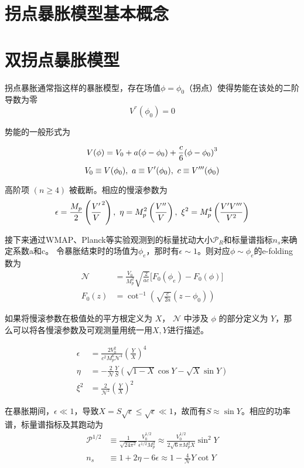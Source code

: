 \section{拐点暴胀模型基本概念}
\section{双拐点暴胀模型}
拐点暴胀通常指这样的暴胀模型，存在场值$\phi=\phi_0$（拐点）使得势能在该处的二阶导数为零
\begin{equation}
    V^{\dprime}(\phi_0) = 0
\end{equation}

势能的一般形式为

\begin{equation}
    \label{eq:inf_potential}
    V (\phi)=V_0+a (\phi-\phi_0)+\frac{c}{6}{\left(\phi-\phi_0\right)}^3\\
\end{equation}
\begin{equation}
    V_0\equiv V (\phi_0),\ a\equiv V' (\phi_0),\ c\equiv V^{\tprime} (\phi_0) 
\end{equation}

高阶项 $(n \geq 4)$ 被截断。相应的慢滚参数为
\begin{equation}
    \label{eq:psrp}
    \epsilon = \frac{M_p}{2}\left(\frac{V'}{V}^2\right),\ \eta=M^2_p
    \left(\frac{V^{\dprime}}{V}\right),\ \xi^2=M^4_p\left(\frac{V'V^{\tprime}}{V^2}\right)
\end{equation}

接下来通过WMAP、Planck等实验观测到的标量扰动大小$\mathcal{P}_R$和标量谱指标$n_s$来确定系数a和c。
令暴胀结束时的场值为$\phi_e$，那时有$\epsilon\sim
1$。则对应$\phi\sim\phi_e$的e-folding数为
\begin{align}
    \label{eq:e-folding}
    \mathcal{N} &= \frac{V_0}{M^2_p}\sqrt{\frac{2}{ac}}\lbrack
    F_0(\phi_e)-F_0(\phi)\rbrack \\
    F_0(z) &= \cot^{-1}\left(\sqrt{\frac{c}{2a}}(z-\phi_0)\right)
\end{align}

如果将慢滚参数在极值处的平方根定义为 $X$， $\mathcal{N}$ 中涉及 $\phi$
的部分定义为 $Y$，那么可以将各慢滚参数及可观测量用统一用$X,Y$进行描述。

\begin{align}
    \epsilon &=
    \frac{2V_0^2}{c^2M_p^6\mathcal{N}^4} {\left(\frac{Y}{X} \right)}^4 \\
    \eta &=
    -\frac{2}{\mathcal{N}}\frac{Y}{S}\left(\sqrt{1-X}\cos Y-\sqrt{X}\sin
    Y\right)\\
    \xi^2 &= \frac{2}{\mathcal{N}^2}{\left(\frac{Y}{X}\right)}^2
\end{align}

在暴胀期间，$\epsilon \ll 1$，导致$X=S\sqrt{\epsilon}\leq\sqrt{\epsilon}\ll
1$，故而有$S\approx \sin Y$。相应的功率谱，标量谱指标及其跑动为
\begin{align}
    \mathcal{P}^{1/2}&\equiv\frac{1}{\sqrt{24\pi^2}}\frac{V_0^{1/2}}{\epsilon^{1/2}M_p^2}
    \approx\frac{V_0^{1/2}}{2\sqrt{6}\pi M_p^2 X}\sin^2Y\\
    n_s&\equiv1+2\eta-6\epsilon\approx1-\frac{4}{\mathcal{N}}Y\cot Y\\
\end{align}
